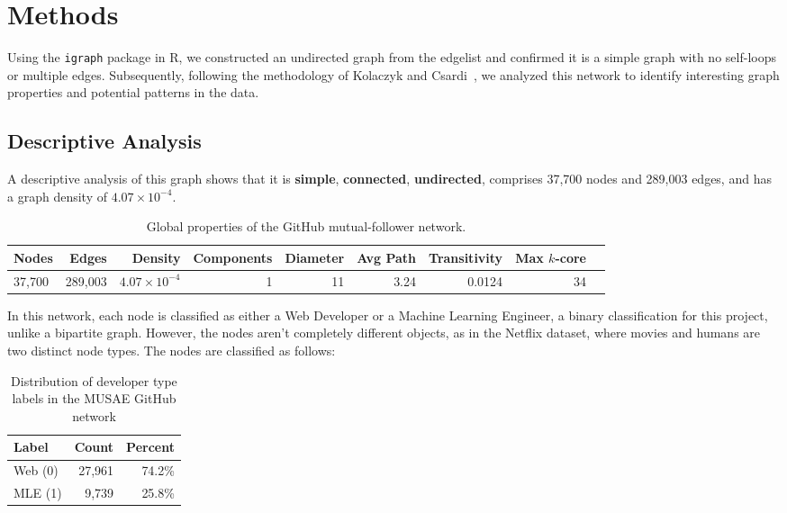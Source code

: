 \documentclass[letterpaper]{article}
\begin{document}
\section{Methods}
Using the \texttt{igraph} package \cite{csardi2006igraph} in R, we constructed an undirected graph from the edgelist and confirmed it is a simple graph with no self-loops or multiple edges. Subsequently, following the methodology of Kolaczyk and Csardi~\cite{kolaczyk2020sand}, we analyzed this network to identify interesting graph properties and potential patterns in the data.

\subsection{Descriptive Analysis}
A descriptive analysis of this graph shows that it is \textbf{simple}, \textbf{connected}, \textbf{undirected}, comprises 37,700 nodes and 289,003 edges, and has a graph density of $4.07 \times 10^{-4}$.
\begin{table}[H]
  \centering
  \begin{tabular}{lrrrrrrrr}
    \toprule
    \textbf{Nodes} & \textbf{Edges} & \textbf{Density} & \textbf{Components} & \textbf{Diameter} & \textbf{Avg Path} & \textbf{Transitivity} & \textbf{Max $k$-core} \\
    \midrule
    37,700 & 289,003 & $4.07 \times 10^{-4}$ & 1 & 11 & 3.24 & 0.0124 & 34 \\
    \bottomrule
  \end{tabular}
  \caption{Global properties of the GitHub mutual-follower network.}
  \label{tab:global}
\end{table}

In this network, each node is classified as either a Web Developer or a Machine Learning Engineer, a binary classification for this project, unlike a bipartite graph. However, the nodes aren't completely different objects, as in the Netflix dataset, where movies and humans are two distinct node types. The nodes are classified as follows:
\begin{table}[H]
  \centering
  \begin{tabular}{|l|r|r|}
    \hline
    \textbf{Label} & \textbf{Count} & \textbf{Percent} \\
    \hline
    Web (0) & 27,961 & 74.2\% \\
    MLE (1) & 9,739 & 25.8\% \\
    \hline
  \end{tabular}
  \caption{Distribution of developer type labels in the MUSAE GitHub network}
\end{table}
\end{document}
